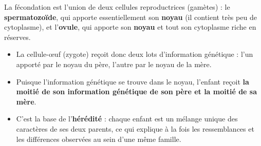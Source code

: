 \documentclass[11pt]{article}
\begin{document}
\begin{exemplebox}
La fécondation est l'union de deux cellules reproductrices (gamètes) : le \textbf{spermatozoïde}, qui apporte essentiellement son \textbf{noyau} (il contient très peu de cytoplasme), et l'\textbf{ovule}, qui apporte son \textbf{noyau} et tout son cytoplasme riche en réserves.
\begin{itemize}
    \item La cellule-œuf (zygote) reçoit donc deux lots d'information génétique : l'un apporté par le noyau du père, l'autre par le noyau de la mère.
    \item Puisque l'information génétique se trouve dans le noyau, l'enfant reçoit \textbf{la moitié de son information génétique de son père et la moitié de sa mère}.
    \item C'est la base de l'\textbf{hérédité} : chaque enfant est un mélange unique des caractères de ses deux parents, ce qui explique à la fois les ressemblances et les différences observées au sein d'une même famille.
\end{itemize}
\end{exemplebox}
\end{document}
